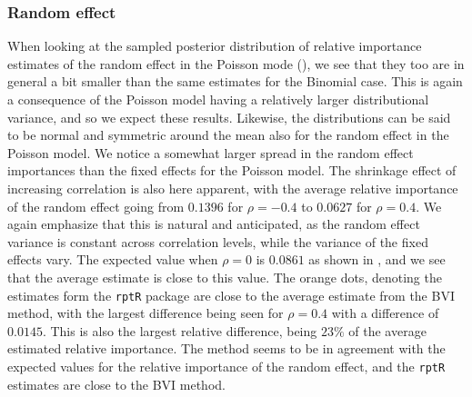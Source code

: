 \subsubsection{Random effect}
When looking at the sampled posterior distribution of relative importance estimates of the random effect in the Poisson mode (), we see that they too are in general a bit smaller than the same estimates for the Binomial case. This is again a consequence of the Poisson model having a relatively larger distributional variance, and so we expect these results. Likewise, the distributions can be said to be normal and symmetric around the mean also for the random effect in the Poisson model. We notice a somewhat larger spread in the random effect importances than the fixed effects for the Poisson model. The shrinkage effect of increasing correlation is also here apparent, with the average relative importance of the random effect going from $0.1396$ for $\rho=-0.4$ to $0.0627$ for $\rho=0.4$. We again emphasize that this is natural and anticipated, as the random effect variance is constant across correlation levels, while the variance of the fixed effects vary. The expected value when $\rho=0$ is $0.0861$ as shown in , and we see that the average estimate is close to this value. The orange dots, denoting the estimates form the \texttt{rptR} package are close to the average estimate from the BVI method, with the largest difference being seen for $\rho=0.4$ with a difference of $0.0145$. This is also the largest relative difference, being $23\%$ of the average estimated relative importance. The method seems to be in agreement with the expected values for the relative importance of the random effect, and the \texttt{rptR} estimates are close to the BVI method.
